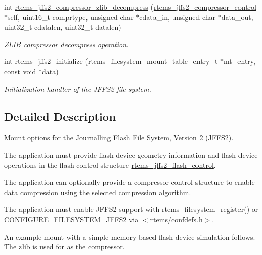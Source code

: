 \begin{DoxyCompactItemize}
\mbox{\label{group__JFFS2_gadb16dfa3863ac961f1f88533fa37e5c7}} 
int \mbox{\hyperlink{group__JFFS2_gadb16dfa3863ac961f1f88533fa37e5c7}{rtems\+\_\+jffs2\+\_\+compressor\+\_\+zlib\+\_\+decompress}} (\mbox{\hyperlink{structrtems__jffs2__compressor__control}{rtems\+\_\+jffs2\+\_\+compressor\+\_\+control}} $\ast$self, uint16\+\_\+t comprtype, unsigned char $\ast$cdata\+\_\+in, unsigned char $\ast$data\+\_\+out, uint32\+\_\+t cdatalen, uint32\+\_\+t datalen)
\begin{DoxyCompactList}\small\item\em Z\+L\+IB compressor decompress operation. \end{DoxyCompactList}\item 
int \mbox{\hyperlink{group__JFFS2_gac493238b3bfd792173aacb9a7f57949e}{rtems\+\_\+jffs2\+\_\+initialize}} (\mbox{\hyperlink{structrtems__filesystem__mount__table__entry__tt}{rtems\+\_\+filesystem\+\_\+mount\+\_\+table\+\_\+entry\+\_\+t}} $\ast$mt\+\_\+entry, const void $\ast$data)
\begin{DoxyCompactList}\small\item\em Initialization handler of the J\+F\+F\+S2 file system. \end{DoxyCompactList}\end{DoxyCompactItemize}


\subsection{Detailed Description}
Mount options for the Journalling Flash File System, Version 2 (J\+F\+F\+S2). 

The application must provide flash device geometry information and flash device operations in the flash control structure \mbox{\hyperlink{structrtems__jffs2__flash__control}{rtems\+\_\+jffs2\+\_\+flash\+\_\+control}}.

The application can optionally provide a compressor control structure to enable data compression using the selected compression algorithm.

The application must enable J\+F\+F\+S2 support with \mbox{\hyperlink{group__FileSystemTypesAndMount_gaac7f1c7fe78f3acc145272809cef62a2}{rtems\+\_\+filesystem\+\_\+register()}} or C\+O\+N\+F\+I\+G\+U\+R\+E\+\_\+\+F\+I\+L\+E\+S\+Y\+S\+T\+E\+M\+\_\+\+J\+F\+F\+S2 via $<$\mbox{\hyperlink{confdefs_8h}{rtems/confdefs.\+h}}$>$.

An example mount with a simple memory based flash device simulation follows. The zlib is used for as the compressor.


